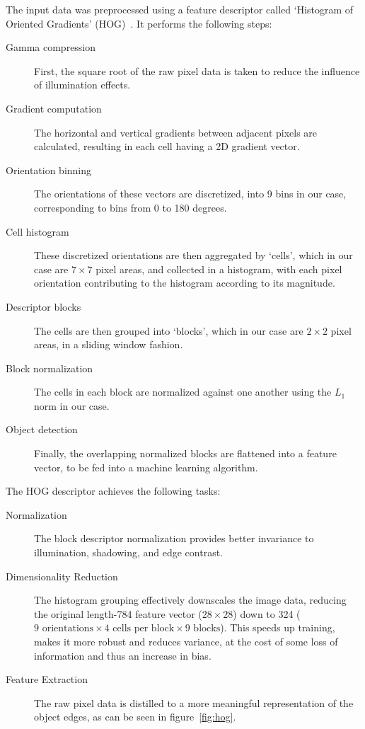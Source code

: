 \documentclass[landscape,twocolumn]{article}
\begin{document}
The input data was preprocessed using a feature descriptor called `Histogram of Oriented Gradients' (HOG)~\cite{dalal2005histograms}. It performs the following steps:
\begin{description}
	\item[Gamma compression] First, the square root of the raw pixel data is taken to reduce the influence of illumination effects.
	\item[Gradient computation] The horizontal and vertical gradients between adjacent pixels are calculated, resulting in each cell having a 2D gradient vector.
	\item[Orientation binning] The orientations of these vectors are discretized, into 9 bins in our case, corresponding to bins from 0 to 180 degrees.
	\item[Cell histogram] These discretized orientations are then aggregated by `cells', which in our case are $7 \times 7$ pixel areas, and collected in a histogram, with each pixel orientation contributing to the histogram according to its magnitude.
	\item[Descriptor blocks] The cells are then grouped into `blocks', which in our case are $2 \times 2$ pixel areas, in a sliding window fashion.
	\item[Block normalization] The cells in each block are normalized against one another using the $L_1$ norm in our case.
	\item[Object detection] Finally, the overlapping normalized blocks are flattened into a feature vector, to be fed into a machine learning algorithm.
\end{description}

The HOG descriptor achieves the following tasks:

\begin{description}
	\item[Normalization] The block descriptor normalization provides better invariance to illumination, shadowing, and edge contrast.
	\item[Dimensionality Reduction] The histogram grouping effectively downscales the image data, reducing the original length-784 feature vector ($28 \times 28$) down to 324 ($\text{9 orientations} \times \text{4 cells per block} \times \text{9 blocks}$). This speeds up training, makes it more robust and reduces variance, at the cost of some loss of information and thus an increase in bias.
	\item[Feature Extraction] The raw pixel data is distilled to a more meaningful representation of the object edges, as can be seen in figure~\ref{fig:hog}.
\end{description}
\end{document}
